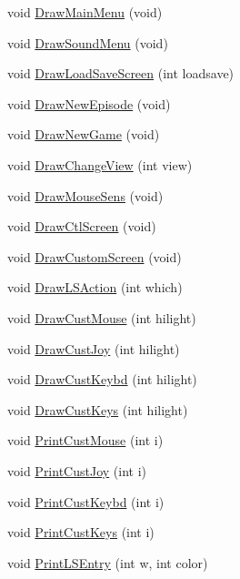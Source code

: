 \begin{DoxyCompactItemize}
\item 
void \hyperlink{WL__MENU_8H_a37408297ab32e806235fdbc3da553d8d}{DrawMainMenu} (void)
\item 
void \hyperlink{WL__MENU_8H_a7ecd6a0fd9c404482ff312f2acd68271}{DrawSoundMenu} (void)
\item 
void \hyperlink{WL__MENU_8H_ae1fe464efcd5a1d1f43e8dabc2841832}{DrawLoadSaveScreen} (int loadsave)
\item 
void \hyperlink{WL__MENU_8H_a41d17005e1b49c4a62b1506b9d213a12}{DrawNewEpisode} (void)
\item 
void \hyperlink{WL__MENU_8H_a4f8733a1d462a92cecf3cff18eb486ba}{DrawNewGame} (void)
\item 
void \hyperlink{WL__MENU_8H_ad799719f482b9ac14dab51685b6d635a}{DrawChangeView} (int view)
\item 
void \hyperlink{WL__MENU_8H_ac707d72c852bfe2a24938dde3c5397f6}{DrawMouseSens} (void)
\item 
void \hyperlink{WL__MENU_8H_adc512396867a80e9e24c51d288b0c828}{DrawCtlScreen} (void)
\item 
void \hyperlink{WL__MENU_8H_a2173c3a8943509f99cb5ac01f2a111a6}{DrawCustomScreen} (void)
\item 
void \hyperlink{WL__MENU_8H_a70ea63f2a40cfe667ba078830e3071d4}{DrawLSAction} (int which)
\item 
void \hyperlink{WL__MENU_8H_a79141a9518504a36ce3c15682aa836ec}{DrawCustMouse} (int hilight)
\item 
void \hyperlink{WL__MENU_8H_a91236b82219168a5270605919725ba2c}{DrawCustJoy} (int hilight)
\item 
void \hyperlink{WL__MENU_8H_a55ce148269754602b0c814448911b27d}{DrawCustKeybd} (int hilight)
\item 
void \hyperlink{WL__MENU_8H_ace6221928d863a720c5674fad34b11fa}{DrawCustKeys} (int hilight)
\item 
void \hyperlink{WL__MENU_8H_a997209233b25445a026a6e5ca017dd57}{PrintCustMouse} (int i)
\item 
void \hyperlink{WL__MENU_8H_a88eda1a3eb3e81618c3fdd5debf5f8ff}{PrintCustJoy} (int i)
\item 
void \hyperlink{WL__MENU_8H_adcd1d339231514422736a0da10f0b92b}{PrintCustKeybd} (int i)
\item 
void \hyperlink{WL__MENU_8H_aff9049f7e08b5e6a90e8da5bb81b287a}{PrintCustKeys} (int i)
\item 
void \hyperlink{WL__MENU_8H_acaacbb88f7b7d163245141e126592577}{PrintLSEntry} (int w, int color)
\item 

\end{DoxyCompactItemize}
